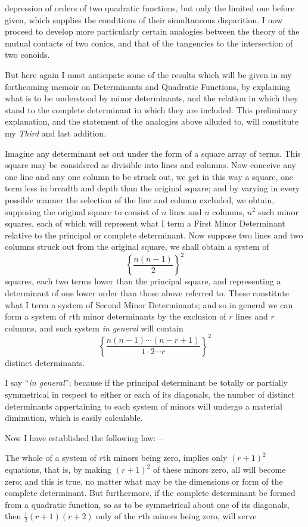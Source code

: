 \documentclass[11pt]{article}
\newcommand{\sourcepage}[1]{\marginpar{\scriptsize p.~#1}}
\begin{document}
{{\sourcepage{147}
depression of orders of two quadratic functions, but only the limited one before given, which supplies the conditions of their simultaneous disparition. I now proceed to develop more particularly certain analogies between the theory of the mutual contacts of two conics, and that of the tangencies to the intersection of two conoids.

But here again I must anticipate some of the results which will be given in my forthcoming memoir on Determinants and Quadratic Functions, by explaining what is to be understood by minor determinants, and the relation in which they stand to the complete determinant in which they are included. This preliminary explanation, and the statement of the analogies above alluded to, will constitute my \emph{Third} and last addition.

Imagine any determinant set out under the form of a square array of terms. This square may be considered as divisible into lines and columns. Now conceive any one line and any one column to be struck out, we get in this way a square, one term less in breadth and depth than the original square; and by varying in every possible manner the selection of the line and column excluded, we obtain, supposing the original square to consist of $n$ lines and $n$ columns, $n^2$ such minor squares, each of which will represent what I term a First Minor Determinant relative to the principal or complete determinant. Now suppose two lines and two columns struck out from the original square, we shall obtain a system of
\[
\left\{\frac{n(n-1)}{2}\right\}^2
\]
squares, each two terms lower than the principal square, and representing a determinant of one lower order than those above referred to. These constitute what I term a system of Second Minor Determinants; and so in general we can form a system of $r$th minor determinants by the exclusion of $r$ lines and $r$ columns, and such system \emph{in general} will contain
\[
\left\{\frac{n(n-1)\cdots(n-r+1)}{1\cdot2\cdots r}\right\}^2
\]
distinct determinants.

I say ``\emph{in general}''; because if the principal determinant be totally or partially symmetrical in respect to either or each of its diagonals, the number of distinct determinants appertaining to each system of minors will undergo a material diminution, which is easily calculable.

Now I have established the following law:---

The whole of a system of $r$th minors being zero, implies only $(r+1)^2$ equations, that is, by making $(r+1)^2$ of these minors zero, all will become zero; and this is true, no matter what may be the dimensions or form of the complete determinant. But furthermore, if the complete determinant be formed from a quadratic function, so as to be symmetrical about one of its diagonals, then $\frac12(r+1)(r+2)$ only of the $r$th minors being zero, will serve

}}
\end{document}
